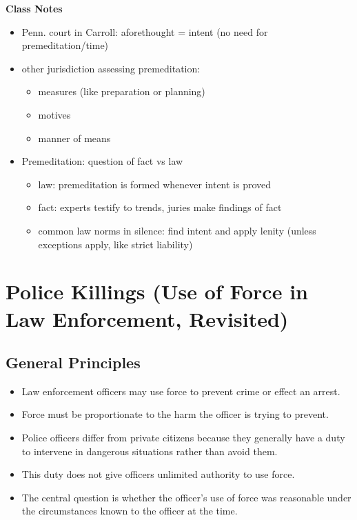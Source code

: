 \documentclass[11pt]{tex/lawoutline}
\begin{document}
\textbf{Class Notes}
\begin{itemize}
    \item Penn. court in Carroll: aforethought = intent (no need for premeditation/time)
    \item other jurisdiction assessing premeditation:
    \begin{itemize}
        \item measures (like preparation or planning)
        \item motives
        \item manner of means
    \end{itemize}
    \item Premeditation: question of fact vs law
    \begin{itemize}
        \item law: premeditation is formed whenever intent is proved
        \item fact: experts testify to trends, juries make findings of fact
        \item common law norms in silence: find intent and apply lenity (unless exceptions apply, like strict liability)
    \end{itemize}
\end{itemize}


\section{Police Killings (Use of Force in Law Enforcement, Revisited)}

\subsection{General Principles}
{
\begin{itemize}
    \item Law enforcement officers may use force to prevent crime or effect an arrest.
    \item Force must be proportionate to the harm the officer is trying to prevent.
    \item Police officers differ from private citizens because they generally have a duty to intervene in dangerous situations rather than avoid them.
    \item This duty does not give officers unlimited authority to use force.
    \item The central question is whether the officer's use of force was reasonable under the circumstances known to the officer at the time.
\end{itemize}
}
\end{document}
